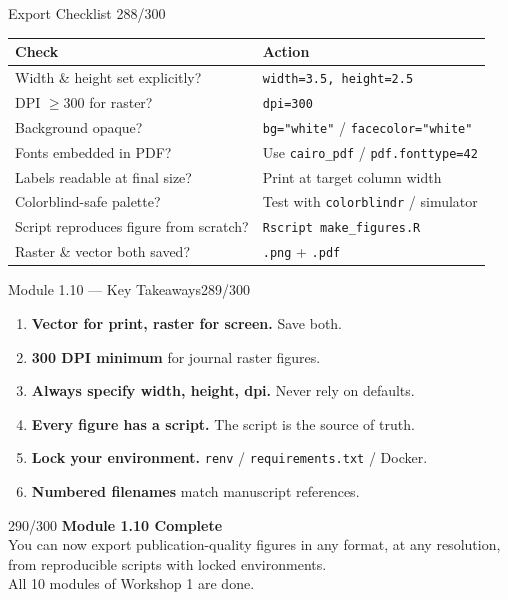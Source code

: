 \documentclass[10pt]{beamer}
\newcommand{\smark}[1]{\hfill{\scriptsize\color{codegray}#1}}
\begin{document}
\begin{frame}{Export Checklist}
\smark{288/300}
\centering\small
\begin{tabular}{@{}ll@{}}
    \toprule
    \textbf{Check} & \textbf{Action} \\
    \midrule
    Width \& height set explicitly?       & \texttt{width=3.5, height=2.5} \\
    DPI $\geq$300 for raster?             & \texttt{dpi=300} \\
    Background opaque?                    & \texttt{bg="white"} / \texttt{facecolor="white"} \\
    Fonts embedded in PDF?                & Use \texttt{cairo\_pdf} / \texttt{pdf.fonttype=42} \\
    Labels readable at final size?        & Print at target column width \\
    Colorblind-safe palette?              & Test with \texttt{colorblindr} / simulator \\
    Script reproduces figure from scratch?& \texttt{Rscript make\_figures.R} \\
    Raster \& vector both saved?          & \texttt{.png} + \texttt{.pdf} \\
    \bottomrule
\end{tabular}
\end{frame}

\begin{frame}{Module 1.10 --- Key Takeaways}\smark{289/300}
\begin{enumerate}
    \item \textbf{Vector for print, raster for screen.} Save both.
    \item \textbf{300 DPI minimum} for journal raster figures.
    \item \textbf{Always specify width, height, dpi.} Never rely on defaults.
    \item \textbf{Every figure has a script.} The script is the source of truth.
    \item \textbf{Lock your environment.} \texttt{renv} / \texttt{requirements.txt} / Docker.
    \item \textbf{Numbered filenames} match manuscript references.
\end{enumerate}
\end{frame}

\begin{frame}{}\smark{290/300}
\centering\vspace{1.5cm}
{\Large\textbf{Module 1.10 Complete}}\\[0.5cm]
You can now export publication-quality figures in any format, at any resolution, from reproducible scripts with locked environments.\\[0.5cm]
All 10 modules of Workshop 1 are done.
\end{frame}
\end{document}
